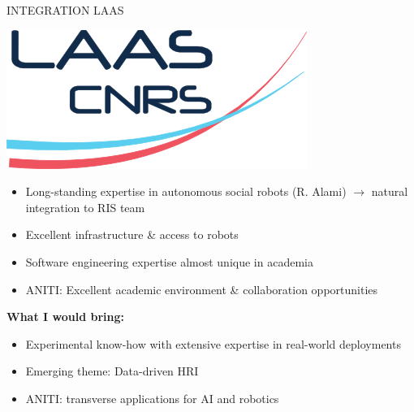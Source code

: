 \documentclass[xcolor=table]{beamer}
\makeatletter
\def\beamer@writeslidentry@miniframesoff{%
  \expandafter\beamer@ifempty\expandafter{\beamer@framestartpage}{}%
  {%
    \clearpage\beamer@notesactions%
  }
}
\newcommand*{\miniframesoff}{\let\beamer@writeslidentry=\beamer@writeslidentry@miniframesoff}
\makeatother
\begin{document}
\miniframesoff{}

\begin{frame}{INTEGRATION LAAS}

    \begin{center}
        \includegraphics[width=0.3\linewidth]{Laas-CNRS}

    \end{center}

    \begin{itemize}
        \item Long-standing expertise in autonomous social robots (R. Alami) $\rightarrow$ natural integration to RIS team
        \item Excellent infrastructure \& access to robots
        \item Software engineering expertise almost unique in academia
        \item ANITI: Excellent academic environment \& collaboration
            opportunities
    \end{itemize}

    \pause

    \textbf{What I would bring:}

    \begin{itemize}
        \item Experimental know-how with extensive expertise in real-world deployments
        \item Emerging theme: Data-driven HRI
        \item ANITI: transverse applications for AI and robotics
    \end{itemize}
\end{frame}

\end{document}
